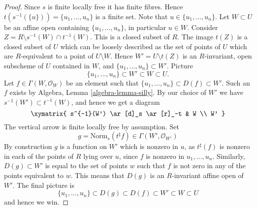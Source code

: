 \begin{proof}
Since $s$ is finite locally free it has finite fibres. Hence
$t(s^{-1}(\{u\})) = \{u_1, \ldots, u_n\}$ is a finite set.
Note that $u \in \{u_1, \ldots, u_n\}$.
Let $W \subset U$ be an affine open containing $\{u_1, \ldots, u_n\}$,
in particular $u \in W$. Consider
$Z = R \setminus s^{-1}(W) \cap t^{-1}(W)$. This is a closed subset
of $R$. The image $t(Z)$ is a closed subset of $U$ which can be loosely
described as the set of points of $U$ which are $R$-equivalent to a point
of $U \setminus W$. Hence $W' = U \setminus t(Z)$ is an $R$-invariant, open
subscheme of $U$ contained in $W$, and $\{u_1, \ldots, u_n\} \subset W'$.
Picture
$$
\{u_1, \ldots, u_n\} \subset W' \subset W \subset U.
$$
Let $f \in \Gamma(W, \mathcal{O}_W)$ be an element such that
$\{u_1, \ldots, u_n\} \subset D(f) \subset W'$. Such an $f$ exists by
Algebra, Lemma \ref{algebra-lemma-silly}. By our choice of $W'$ we
have $s^{-1}(W') \subset t^{-1}(W)$, and hence we get a diagram
$$
\xymatrix{
s^{-1}(W') \ar[d]_s \ar[r]_-t & W \\
W'
}
$$
The vertical arrow is finite locally free by assumption. Set
$$
g = \text{Norm}_s(t^\sharp f) \in \Gamma(W', \mathcal{O}_{W'})
$$
By construction $g$ is a function on $W'$ which is
nonzero in $u$, as $t^\sharp(f)$ is nonzero in each of the points of
$R$ lying over $u$, since $f$ is nonzero in $u_1, \ldots, u_n$.
Similarly, $D(g) \subset W'$ is equal to the
set of points $w$ such that $f$ is not zero in any of the points
equivalent to $w$. This means that $D(g)$ is an
$R$-invariant affine open of $W'$. The final picture is
$$
\{u_1, \ldots, u_n\} \subset D(g) \subset D(f) \subset W' \subset W \subset U
$$
and hence we win.
\end{proof}































